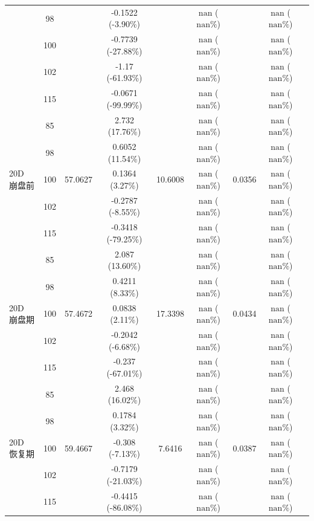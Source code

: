 \begin{table}[htbp]
{\begin{tabular}{lclcccccc}
    & 98 & & -0.1522 (-3.90\%) & & $\mathrm{nan}$ ($\mathrm{nan}\%$) & & $\mathrm{nan}$ ($\mathrm{nan}\%$) \\
    & 100 & & -0.7739 (-27.88\%) & & $\mathrm{nan}$ ($\mathrm{nan}\%$) & & $\mathrm{nan}$ ($\mathrm{nan}\%$) \\
    & 102 & & -1.17 (-61.93\%) & & $\mathrm{nan}$ ($\mathrm{nan}\%$) & & $\mathrm{nan}$ ($\mathrm{nan}\%$) \\
    & 115 & & -0.0671 (-99.99\%) & & $\mathrm{nan}$ ($\mathrm{nan}\%$) & & $\mathrm{nan}$ ($\mathrm{nan}\%$) \\
    \midrule
    \multirow{5}{*}{20D 崩盘前}
    & 85 & \multirow{5}{*}{57.0627} & 2.732 (17.76\%) & \multirow{5}{*}{10.6008} & $\mathrm{nan}$ ($\mathrm{nan}\%$) & \multirow{5}{*}{0.0356} & $\mathrm{nan}$ ($\mathrm{nan}\%$) \\
    & 98 & & 0.6052 (11.54\%) & & $\mathrm{nan}$ ($\mathrm{nan}\%$) & & $\mathrm{nan}$ ($\mathrm{nan}\%$) \\
    & 100 & & 0.1364 (3.27\%) & & $\mathrm{nan}$ ($\mathrm{nan}\%$) & & $\mathrm{nan}$ ($\mathrm{nan}\%$) \\
    & 102 & & -0.2787 (-8.55\%) & & $\mathrm{nan}$ ($\mathrm{nan}\%$) & & $\mathrm{nan}$ ($\mathrm{nan}\%$) \\
    & 115 & & -0.3418 (-79.25\%) & & $\mathrm{nan}$ ($\mathrm{nan}\%$) & & $\mathrm{nan}$ ($\mathrm{nan}\%$) \\
    \midrule
    \multirow{5}{*}{20D 崩盘期}
    & 85 & \multirow{5}{*}{57.4672} & 2.087 (13.60\%) & \multirow{5}{*}{17.3398} & $\mathrm{nan}$ ($\mathrm{nan}\%$) & \multirow{5}{*}{0.0434} & $\mathrm{nan}$ ($\mathrm{nan}\%$) \\
    & 98 & & 0.4211 (8.33\%) & & $\mathrm{nan}$ ($\mathrm{nan}\%$) & & $\mathrm{nan}$ ($\mathrm{nan}\%$) \\
    & 100 & & 0.0838 (2.11\%) & & $\mathrm{nan}$ ($\mathrm{nan}\%$) & & $\mathrm{nan}$ ($\mathrm{nan}\%$) \\
    & 102 & & -0.2042 (-6.68\%) & & $\mathrm{nan}$ ($\mathrm{nan}\%$) & & $\mathrm{nan}$ ($\mathrm{nan}\%$) \\
    & 115 & & -0.237 (-67.01\%) & & $\mathrm{nan}$ ($\mathrm{nan}\%$) & & $\mathrm{nan}$ ($\mathrm{nan}\%$) \\
    \midrule
    \multirow{5}{*}{20D 恢复期}
    & 85 & \multirow{5}{*}{59.4667} & 2.468 (16.02\%) & \multirow{5}{*}{7.6416} & $\mathrm{nan}$ ($\mathrm{nan}\%$) & \multirow{5}{*}{0.0387} & $\mathrm{nan}$ ($\mathrm{nan}\%$) \\
    & 98 & & 0.1784 (3.32\%) & & $\mathrm{nan}$ ($\mathrm{nan}\%$) & & $\mathrm{nan}$ ($\mathrm{nan}\%$) \\
    & 100 & & -0.308 (-7.13\%) & & $\mathrm{nan}$ ($\mathrm{nan}\%$) & & $\mathrm{nan}$ ($\mathrm{nan}\%$) \\
    & 102 & & -0.7179 (-21.03\%) & & $\mathrm{nan}$ ($\mathrm{nan}\%$) & & $\mathrm{nan}$ ($\mathrm{nan}\%$) \\
    & 115 & & -0.4415 (-86.08\%) & & $\mathrm{nan}$ ($\mathrm{nan}\%$) & & $\mathrm{nan}$ ($\mathrm{nan}\%$) \\
    \bottomrule
  \end{tabular}%
  }
\end{table}
